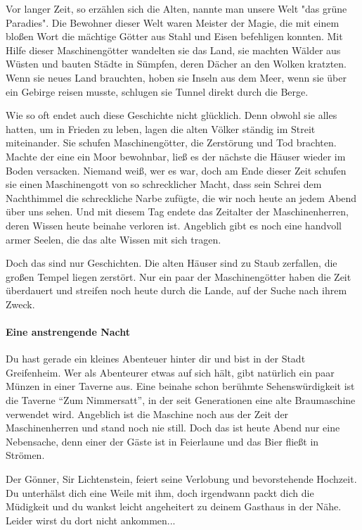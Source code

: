 Vor langer Zeit, so erzählen sich die Alten, nannte man unsere Welt "das grüne Paradies". Die Bewohner dieser Welt waren Meister der Magie, die mit einem bloßen Wort die mächtige Götter aus Stahl und Eisen befehligen konnten. Mit Hilfe dieser Maschinengötter wandelten sie das Land, sie machten Wälder aus Wüsten und bauten Städte in Sümpfen, deren Dächer an den Wolken kratzten. Wenn sie neues Land brauchten, hoben sie Inseln aus dem Meer, wenn sie über ein Gebirge reisen musste, schlugen sie Tunnel direkt durch die Berge.

Wie so oft endet auch diese Geschichte nicht glücklich. Denn obwohl sie alles hatten, um in Frieden zu leben, lagen die alten Völker ständig im Streit miteinander. Sie schufen Maschinengötter, die Zerstörung und Tod brachten. Machte der eine ein Moor bewohnbar, ließ es der nächste die Häuser wieder im Boden versacken. Niemand weiß, wer es war, doch am Ende dieser Zeit schufen sie einen Maschinengott von so schrecklicher Macht, dass sein Schrei dem Nachthimmel die schreckliche Narbe zufügte, die wir noch heute an jedem Abend über uns sehen. Und mit diesem Tag endete das Zeitalter der Maschinenherren, deren Wissen heute beinahe verloren ist. Angeblich gibt es noch eine handvoll armer Seelen, die das alte Wissen mit sich tragen.

Doch das sind nur Geschichten. Die alten Häuser sind zu Staub zerfallen, die großen Tempel liegen zerstört. Nur ein paar der Maschinengötter haben die Zeit überdauert und streifen noch heute durch die Lande, auf der Suche nach ihrem Zweck.

\paragraph{Eine anstrengende Nacht}

Du hast gerade ein kleines Abenteuer hinter dir und bist in der Stadt Greifenheim. Wer als Abenteurer etwas auf sich hält, gibt natürlich ein paar Münzen in einer Taverne aus. Eine beinahe schon berühmte Sehenswürdigkeit ist die Taverne ``Zum Nimmersatt'', in der seit Generationen eine alte Braumaschine verwendet wird. Angeblich ist die Maschine noch aus der Zeit der Maschinenherren und stand noch nie still. Doch das ist heute Abend nur eine Nebensache, denn einer der Gäste ist in Feierlaune und das Bier fließt in Strömen.

Der Gönner, Sir Lichtenstein, feiert seine Verlobung und bevorstehende Hochzeit. Du unterhälst dich eine Weile mit ihm, doch irgendwann packt dich die Müdigkeit und du wankst leicht angeheitert zu deinem Gasthaus in der Nähe. Leider wirst du dort nicht ankommen...
